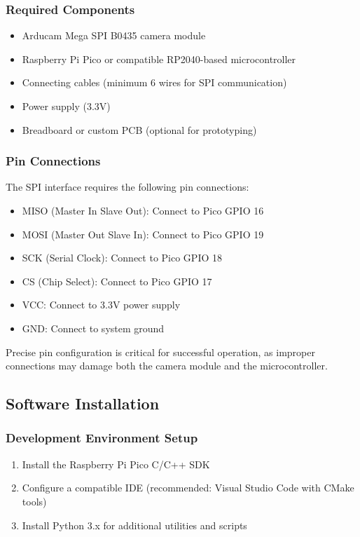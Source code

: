 \subsubsection{Required Components}
\begin{itemize}
	\item Arducam Mega SPI B0435 camera module
	\item Raspberry Pi Pico or compatible RP2040-based microcontroller
	\item Connecting cables (minimum 6 wires for SPI communication)
	\item Power supply (3.3V)
	\item Breadboard or custom PCB (optional for prototyping)
\end{itemize}

\subsubsection{Pin Connections}
The SPI interface requires the following pin connections:
\begin{itemize}
	\item MISO (Master In Slave Out): Connect to Pico GPIO 16
	\item MOSI (Master Out Slave In): Connect to Pico GPIO 19
	\item SCK (Serial Clock): Connect to Pico GPIO 18
	\item CS (Chip Select): Connect to Pico GPIO 17
	\item VCC: Connect to 3.3V power supply
	\item GND: Connect to system ground
\end{itemize}

Precise pin configuration is critical for successful operation, as improper connections may damage both the camera module and the microcontroller.

\subsection{Software Installation}
\subsubsection{Development Environment Setup}
\begin{enumerate}
	\item Install the Raspberry Pi Pico C/C++ SDK
	\item Configure a compatible IDE (recommended: Visual Studio Code with CMake tools)
	\item Install Python 3.x for additional utilities and scripts
\end{enumerate}

